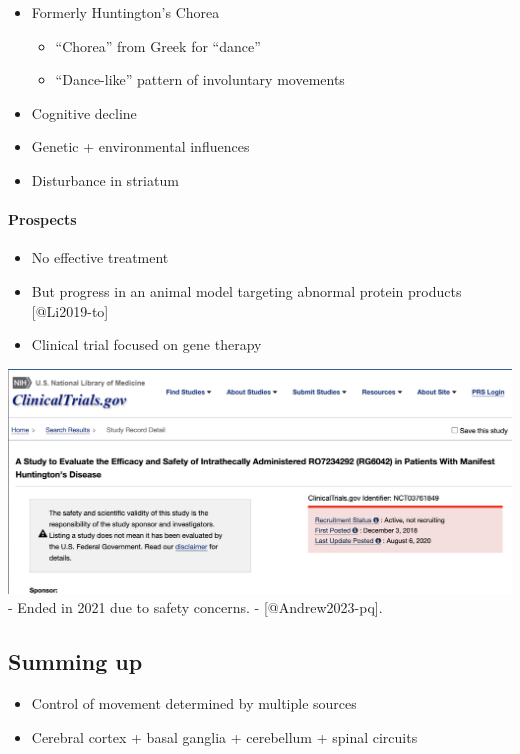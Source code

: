 \documentclass[
  letterpaper,
  DIV=11,
  numbers=noendperiod]{scrartcl}
\let\oldparagraph\paragraph
\renewcommand{\paragraph}[1]{\oldparagraph{#1}\mbox{}}
\providecommand{\tightlist}{%
  \setlength{\itemsep}{0pt}\setlength{\parskip}{0pt}}\usepackage{longtable,booktabs,array}
\begin{document}
\begin{itemize}
\tightlist
\item
  Formerly Huntington's Chorea

  \begin{itemize}
  \tightlist
  \item
    ``Chorea'' from Greek for ``dance''
  \item
    ``Dance-like'' pattern of involuntary movements
  \end{itemize}
\item
  Cognitive decline
\item
  Genetic + environmental influences
\item
  Disturbance in striatum
\end{itemize}

\paragraph{Prospects}\label{prospects}

\begin{itemize}
\tightlist
\item
  No effective treatment
\item
  But progress in an animal model targeting abnormal protein products
  {[}@Li2019-to{]}
\item
  Clinical trial focused on gene therapy
\end{itemize}

\includegraphics{../include/img/huntingtons-trial.png} - Ended in 2021
due to safety concerns. - {[}@Andrew2023-pq{]}.

\subsection{Summing up}\label{summing-up}

\begin{itemize}
\tightlist
\item
  Control of movement determined by multiple sources
\item
  Cerebral cortex + basal ganglia + cerebellum + spinal circuits
\end{itemize}
\end{document}
